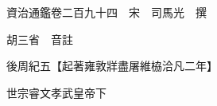 










 


 
 


 

  
  
  
  
  





  
  
  
  
  
 
  

  

  
  
  



  

 
 

  
   




  

  
  


  　　資治通鑑卷二百九十四　宋　司馬光　撰

　　胡三省　音註

　　後周紀五【起著雍敦牂盡屠維栛洽凡二年】

　　世宗睿文孝武皇帝下

